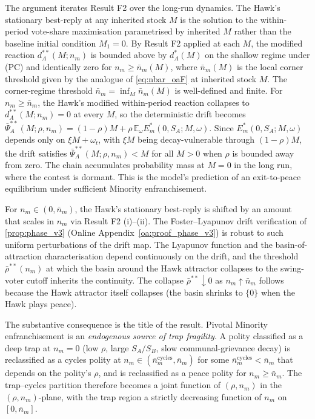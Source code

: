 \documentclass[11pt,twoside]{extarticle}
\begin{document}
The argument iterates Result F2 over the long-run dynamics. The Hawk's stationary best-reply at any inherited stock $M$ is the solution to the within-period vote-share maximisation parametrised by inherited $M$ rather than the baseline initial condition $M_1=0$. By Result F2 applied at each $M$, the modified reaction $d_A^{**}(M;n_m)$ is bounded above by $d_A^{*}(M)$ on the shallow regime under (PC) and identically zero for $n_m\ge\bar n_m(M)$, where $\bar n_m(M)$ is the local corner threshold given by the analogue of \autoref{eq:nbar_oaF} at inherited stock $M$. The corner-regime threshold $\bar n_m=\inf_M\bar n_m(M)$ is well-defined and finite. For $n_m\ge\bar n_m$, the Hawk's modified within-period reaction collapses to $d_A^{**}(M;n_m)=0$ at every $M$, so the deterministic drift becomes $\bar\Psi_A^{**}(M;\rho,n_m)=(1-\rho)M+\rho\,\mathbb{E}_\omega E_m^{*}(0,S_A;M,\omega)$. Since $E_m^{*}(0,S_A;M,\omega)$ depends only on $\xi M+\omega_t$, with $\xi M$ being decay-vulnerable through $(1-\rho)M$, the drift satisfies $\bar\Psi_A^{**}(M;\rho,n_m)<M$ for all $M>0$ when $\rho$ is bounded away from zero. The chain accumulates probability mass at $M=0$ in the long run, where the contest is dormant. This is the model's prediction of an exit-to-peace equilibrium under sufficient Minority enfranchisement.

For $n_m\in(0,\bar n_m)$, the Hawk's stationary best-reply is shifted by an amount that scales in $n_m$ via Result F2 (i)--(ii). The Foster--Lyapunov drift verification of \autoref{prop:phase_v3} (Online Appendix~\ref{oa:proof_phase_v3}) is robust to such uniform perturbations of the drift map. The Lyapunov function and the basin-of-attraction characterisation depend continuously on the drift, and the threshold $\bar\rho^{**}(n_m)$ at which the basin around the Hawk attractor collapses to the swing-voter cutoff inherits the continuity. The collapse $\bar\rho^{**}\downarrow 0$ as $n_m\uparrow\bar n_m$ follows because the Hawk attractor itself collapses (the basin shrinks to $\{0\}$ when the Hawk plays peace).

The substantive consequence is the title of the result. Pivotal Minority enfranchisement is an \emph{endogenous source of trap fragility}. A polity classified as a deep trap at $n_m=0$ (low $\rho$, large $S_A/S_B$, slow communal-grievance decay) is reclassified as a cycles polity at $n_m\in(\bar n_m^{\text{cycles}},\bar n_m)$ for some $\bar n_m^{\text{cycles}}<\bar n_m$ that depends on the polity's $\rho$, and is reclassified as a peace polity for $n_m\ge\bar n_m$. The trap--cycles partition therefore becomes a joint function of $(\rho,n_m)$ in the $(\rho,n_m)$-plane, with the trap region a strictly decreasing function of $n_m$ on $[0,\bar n_m]$.
\end{document}
